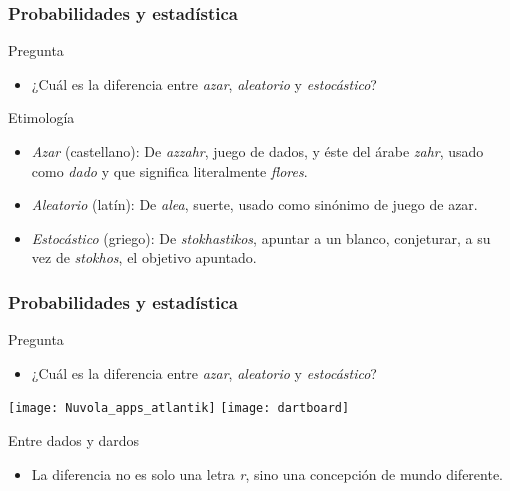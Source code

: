 \documentclass[table]{beamer}
\begin{document}
\begin{frame}
    \frametitle{Probabilidades y estadística}
    \begin{alertblock}{Pregunta}
        \begin{itemize}
            \item ¿Cuál es la diferencia entre \emph{azar}, \emph{aleatorio} y \emph{estocástico}?
        \end{itemize}
    \end{alertblock}
    \begin{block}{Etimología}
        \begin{itemize}
            \item \emph{Azar} (castellano): De \emph{azzahr}, juego de dados, y éste del árabe \emph{zahr}, usado como \emph{dado} y que significa literalmente \emph{flores}.
            \item \emph{Aleatorio} (latín): De \emph{alea}, suerte, usado como sinónimo de juego de azar.
            \item \emph{Estocástico} (griego): De \emph{stokhastikos}, apuntar a un blanco, conjeturar, a su vez de \emph{stokhos}, el objetivo apuntado.
        \end{itemize}
    \end{block}
\end{frame}

\begin{frame}
    \frametitle{Probabilidades y estadística}
    \begin{alertblock}{Pregunta}
        \begin{itemize}
            \item ¿Cuál es la diferencia entre \emph{azar}, \emph{aleatorio} y \emph{estocástico}?
        \end{itemize}
    \end{alertblock}
    \begin{center}
        \texttt{[image: Nuvola\_apps\_atlantik]}
        \texttt{[image: dartboard]}
    \end{center}
    \begin{alertblock}{Entre dados y dardos}
        \begin{itemize}
            \item La diferencia no es solo una letra \emph{r}, sino una concepción de mundo diferente.
        \end{itemize}
    \end{alertblock}
\end{frame}
\end{document}
